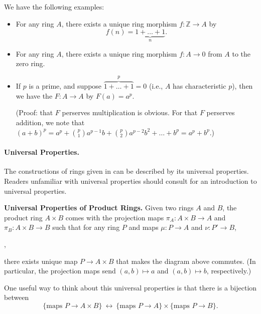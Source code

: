 \begin{example}
    \label{ex:morphisms}
    We have the following examples:
    \begin{itemize}
	\item For any ring $A$, there exists a unique ring
    morphism $f : \mathbb Z\to A$
    by
    $$f(n) = \underbrace{1+\dots+1}_n.$$
    \item For any ring $A$, there exists a 
	unique ring morphism $f : A\to 0$ from $A$ to the zero ring.
    \item If $p$ is a prime, and suppose
	$\overbrace{1+\dots+1}^p = 0$
	(i.e., $A$ has characteristic $p$),
	then we have the 
	$F : A\to A$ by $F(a) = a^p$.

	(Proof: that $F$ perserves multiplication is obvious.
	For that $F$ perserves addition, we note that  
    $(a+b)^p = a^p + \binom p1 a^{p-1}b
	+ \binom p2 a^{p-2}b^2 + \dots + b^p = a^p+b^p$.)
    \end{itemize}
\end{example}
\paragraph{Universal Properties.}
The constructions of rings given in 
can be described by its universal properties. 
Readers unfamiliar with universal properties should consult 
 for an introduction to universal properties.

\textbf{Universal Properties of Product Rings.}
Given two rings $A$ and $B$, the product ring
$A\times B$ comes with the projection maps
$\pi_A : A\times B\to A$ and $\pi_B : A\times B\to B$ such that for any ring 
$P$ and maps $\mu : P\to A$ and $\nu : P'\to B$,
\begin{center}
,
\end{center}
there exists unique map $P\to A\times B$ that makes the diagram 
above commutes.
(In particular, the projection maps send $(a,b)\mapsto a$ 
and $(a,b)\mapsto b$, respectively.)

One useful way to think about this universal properties 
is that there is a bijection between 
$$\{\text{maps } P \to A\times B\} 
\ \longleftrightarrow\ 
\{\text{maps }P\to A\} \times \{\text{maps }P\to B\}.$$

